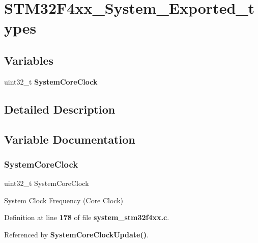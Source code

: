 \section{S\+T\+M32\+F4xx\+\_\+\+System\+\_\+\+Exported\+\_\+types}
\label{group__STM32F4xx__System__Exported__types}
\subsection*{Variables}
\begin{DoxyCompactItemize}
\item 
uint32\+\_\+t \textbf{ System\+Core\+Clock}
\end{DoxyCompactItemize}


\subsection{Detailed Description}


\subsection{Variable Documentation}
\mbox{\label{group__STM32F4xx__System__Exported__types_gaa3cd3e43291e81e795d642b79b6088e6}} 
\subsubsection{System\+Core\+Clock}
{\footnotesize\ttfamily uint32\+\_\+t System\+Core\+Clock}

System Clock Frequency (Core Clock) 

Definition at line \textbf{ 178} of file \textbf{ system\+\_\+stm32f4xx.\+c}.



Referenced by \textbf{ System\+Core\+Clock\+Update()}.

